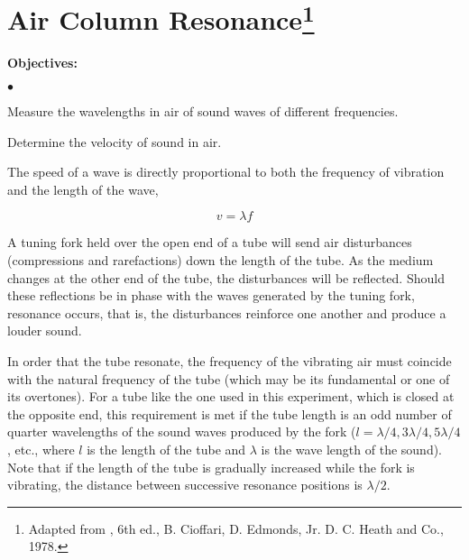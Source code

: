 
\section{Air Column Resonance\footnote{
Adapted from , 6th ed., B. Cioffari, D. Edmonds,
Jr. D. C. Heath and Co., 1978.
}}

\makelabheader %



{\noindent \bf Objectives:} \begin{list}{$\bullet$}{\itemsep0pt }

\item Measure the wavelengths in air of sound waves of different frequencies.

\item Determine the velocity of sound in air.

\end{list}


The speed
of a wave is directly proportional to both the frequency of vibration and the length of the wave,

\begin{equation} v = \lambda f \end{equation}

\noindent A tuning fork held over the open end of a tube will send air disturbances (compressions and rarefactions) down the length of the tube. As the medium changes at the other end of the tube, the disturbances will be reflected. Should these reflections be in phase with the waves generated by the tuning fork, resonance occurs, that is, the disturbances reinforce one another and produce a louder sound.

\noindent In order that the tube resonate, the frequency of the vibrating air must coincide with the natural frequency of the tube (which may be its fundamental or one of its overtones). For a tube like the one used in this experiment, which is closed at the opposite end, this requirement is met if the tube length is an odd number of quarter wavelengths of the sound waves produced by the fork ($l = \lambda/4, 3 \lambda/4, 5 \lambda/4$, etc., where $l$ is the length of the tube and $\lambda$ is the wave length of the sound). Note that if the length of the tube is gradually increased while the fork is vibrating, the distance between successive resonance positions is $\lambda/2$. \\

